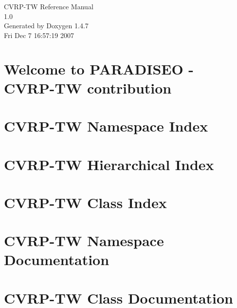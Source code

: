 \documentclass[a4paper]{book}
\begin{document}
\begin{titlepage}
\vspace*{7cm}
\begin{center}
{\Large CVRP-TW Reference Manual\\[1ex]\large 1.0 }\\
\vspace*{1cm}
{\large Generated by Doxygen 1.4.7}\\
\vspace*{0.5cm}
{\small Fri Dec 7 16:57:19 2007}\\
\end{center}
\end{titlepage}
\clearemptydoublepage
{}
\tableofcontents
\clearemptydoublepage
{}
\chapter{Welcome to PARADISEO - CVRP-TW contribution }
\label{index}
\chapter{CVRP-TW Namespace Index}

\chapter{CVRP-TW Hierarchical Index}

\chapter{CVRP-TW Class Index}

\chapter{CVRP-TW Namespace Documentation}

\chapter{CVRP-TW Class Documentation}









\printindex
\end{document}
